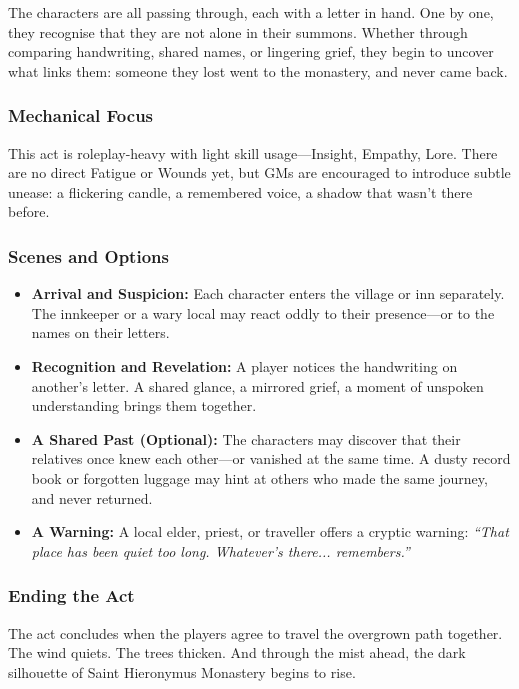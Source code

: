 \documentclass[nodeprecatedcode,bg=print]{dndbook/dndbook}
\begin{document}
The characters are all passing through, each with a letter in hand. One by one, they recognise that they are not alone in their summons. Whether through comparing handwriting, shared names, or lingering grief, they begin to uncover what links them: someone they lost went to the monastery, and never came back.

\subsubsection{Mechanical Focus} This act is roleplay-heavy with light skill usage—Insight, Empathy, Lore. There are no direct Fatigue or Wounds yet, but GMs are encouraged to introduce subtle unease: a flickering candle, a remembered voice, a shadow that wasn’t there before.


\subsubsection{Scenes and Options}
\begin{itemize}
    \item \textbf{Arrival and Suspicion:} Each character enters the village or inn separately. The innkeeper or a wary local may react oddly to their presence—or to the names on their letters.
    
    \item \textbf{Recognition and Revelation:} A player notices the handwriting on another’s letter. A shared glance, a mirrored grief, a moment of unspoken understanding brings them together.
    
    \item \textbf{A Shared Past (Optional):} The characters may discover that their relatives once knew each other—or vanished at the same time. A dusty record book or forgotten luggage may hint at others who made the same journey, and never returned.
    
    \item \textbf{A Warning:} A local elder, priest, or traveller offers a cryptic warning: \emph{“That place has been quiet too long. Whatever’s there... remembers.”}
\end{itemize}



\subsubsection{Ending the Act} The act concludes when the players agree to travel the overgrown path together. The wind quiets. The trees thicken. And through the mist ahead, the dark silhouette of Saint Hieronymus Monastery begins to rise.
\end{document}
